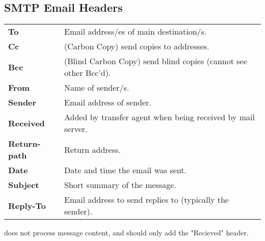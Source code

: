 \documentclass{report}
\begin{document}
        \subsection*{SMTP Email Headers}
            \begin{center}
                \begin{tabular}{l p{}}
                    \textbf{To} & Email address/es of main destination/s. \\
                    \textbf{Cc} & (Carbon Copy) send copies to addresses. \\
                    \textbf{Bcc} & (Blind Carbon Copy) send blind copies (cannot see other Bcc'd).\\
                    \textbf{From} & Name of sender/s. \\
                    \textbf{Sender} & Email address of sender. \\
                    \textbf{Received} & Added by transfer agent when being received by mail server. \\
                    \textbf{Return-path} & Return address. \\
                    \textbf{Date} & Date and time the email was sent. \\
                    \textbf{Subject} & Short summary of the message. \\
                    \textbf{Reply-To} & Email address to send replies to (typically the sender). \\
                \end{tabular}
            \end{center}
             does not process message content, and should only add the "Recieved" header.
\end{document}
